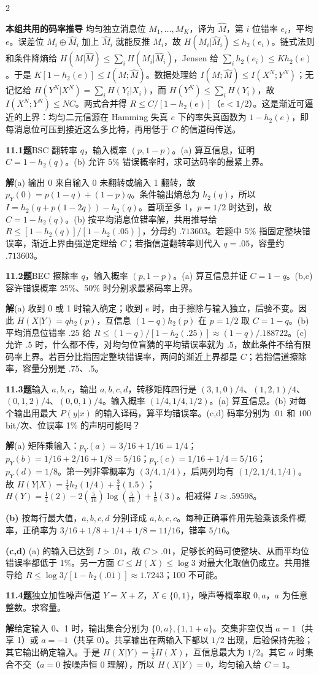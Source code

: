 \documentclass[a4paper]{article}
\newcommand{\cols}{2}
\newcommand{\cols}{4}
\newcommand{\topic}[1]{\par\addvspace{2.6pt}{\color{ink}\bfseries #1}\par\nobreak}
\newcommand{\problem}[2]{\par\addvspace{1.4pt}\textcolor{ink}{\textbf{#1}}\enspace\textbf{题}\enspace #2\par\nobreak}
\newcommand{\solve}{\noindent\textbf{解}\enspace}
\newcommand{\parta}[1]{\par\noindent\textbf{(#1)}\enspace}
\newcommand{\form}[1]{\par\noindent\textbf{#1}\enspace}
\newcommand{\B}{h_2}
\begin{document}
\begin{multicols}{\cols}
\topic{Tut 11 · 容量、错误率与译码}
\form{本组共用的码率推导} 均匀独立消息位 $M_1,\ldots,M_K$，译为 $\hat M$，第 $i$ 位错率 $e_i$，平均 $e$。误差位 $M_i\oplus\hat M_i$ 加上 $\hat M_i$ 就能反推 $M_i$，故 $H(M_i|\hat M_i)\le\B(e_i)$。链式法则和条件降熵给 $H(M|\hat M)\le\sum_iH(M_i|\hat M_i)$，Jensen 给 $\sum_i\B(e_i)\le K\B(e)$。于是 $K[1-\B(e)]\le I(M;\hat M)$。数据处理给 $I(M;\hat M)\le I(X^N;Y^N)$；无记忆给 $H(Y^N|X^N)=\sum_i H(Y_i|X_i)$，而 $H(Y^N)\le\sum_iH(Y_i)$，故 $I(X^N;Y^N)\le NC$。两式合并得 $R\le C/[1-\B(e)]$（$e<1/2$）。这是渐近可逼近的上界：均匀二元信源在 Hamming 失真 $e$ 下的率失真函数为 $1-\B(e)$，即每消息位可压到接近这么多比特，再用低于 $C$ 的信道码传送。
\problem{11.1}{BSC 翻转率 $q$，输入概率 $(p,1-p)$。(a) 算互信息，证明 $C=1-\B(q)$。(b) 允许 5\% 错误概率时，求可达码率的最紧上界。}
\solve (a) 输出 0 来自输入 0 未翻转或输入 1 翻转，故 $p_Y(0)=p(1-q)+(1-p)q$。条件输出熵总为 $\B(q)$，所以 $I=\B(q+p(1-2q))-\B(q)$。首项至多 1，$p=1/2$ 时达到，故 $C=1-\B(q)$。(b) 按平均消息位错率解，共用推导给 $R\le[1-\B(q)]/[1-\B(.05)]$，分母约 $.713603$。若题中 5\% 指固定整块错误率，渐近上界由强逆定理给 $C$；若指信道翻转率则代入 $q=.05$，容量约 $.713603$。
\problem{11.2}{BEC 擦除率 $q$，输入概率 $(p,1-p)$。(a) 算互信息并证 $C=1-q$。(b,c) 容许错误概率 25\%、50\% 时分别求最紧码率上界。}
\solve (a) 收到 0 或 1 时输入确定；收到 $e$ 时，由于擦除与输入独立，后验不变。因此 $H(X|Y)=q\B(p)$，互信息 $(1-q)\B(p)$ 在 $p=1/2$ 取 $C=1-q$。(b) 平均消息位错率 $.25$ 给 $R\le(1-q)/[1-\B(.25)]\approx(1-q)/.188722$。(c) 允许 $.5$ 时，什么都不传，对均匀位盲猜的平均错误率就为 $.5$，故此条件不给有限码率上界。若百分比指固定整块错误率，两问的渐近上界都是 $C$；若指信道擦除率，容量分别是 $.75$、$.5$。
\problem{11.3}{输入 $a,b,c$，输出 $a,b,c,d$，转移矩阵四行是 $(3,1,0)/4$、$(1,2,1)/4$、$(0,1,2)/4$、$(0,0,1)/4$。输入概率 $(1/4,1/4,1/2)$。(a) 算互信息。(b) 对每个输出用最大 $P(y|x)$ 的输入译码，算平均错误率。(c,d) 码率分别为 $.01$ 和 $100$ bit/次、位误率 1\% 的声明可能吗？}
\solve (a) 矩阵乘输入：$p_Y(a)=3/16+1/16=1/4$；$p_Y(b)=1/16+2/16+1/8=5/16$；$p_Y(c)=1/16+1/4=5/16$；$p_Y(d)=1/8$。第一列非零概率为 $(3/4,1/4)$，后两列均有 $(1/2,1/4,1/4)$。故 $H(Y|X)=\tfrac14\B(1/4)+\tfrac34(1.5)$；$H(Y)=\tfrac14(2)-2(\tfrac5{16})\log(\tfrac5{16})+\tfrac18(3)$。相减得 $I\approx.59598$。
\parta{b} 按每行最大值，$a,b,c,d$ 分别译成 $a,b,c,c$。每种正确事件用先验乘该条件概率，正确率为 $3/16+1/8+1/4+1/8=11/16$，错率 $5/16$。
\parta{c,d} (a) 的输入已达到 $I>.01$，故 $C>.01$，足够长的码可使整块、从而平均位错误率都低于 1\%。另一方面 $C\le H(X)\le\log3$ 对最大化取值仍成立。共用推导给 $R\le\log3/[1-\B(.01)]\approx1.7243$；100 不可能。
\problem{11.4}{独立加性噪声信道 $Y=X+Z$，$X\in\{0,1\}$，噪声等概率取 $0,a$，$a$ 为任意整数。求容量。}
\solve 给定输入 0、1 时，输出集合分别为 $\{0,a\},\{1,1+a\}$。交集非空仅当 $a=1$（共享 1）或 $a=-1$（共享 0）。共享输出在两输入下都以 $1/2$ 出现，后验保持先验；其它输出确定输入。于是 $H(X|Y)=\tfrac12H(X)$，互信息最大为 $1/2$。其它 $a$ 时集合不交（$a=0$ 按噪声恒 0 理解），所以 $H(X|Y)=0$，均匀输入给 $C=1$。


\end{multicols}
\end{document}
